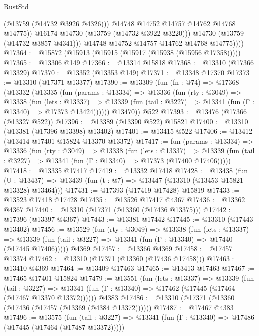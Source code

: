 \begin{lexlean}{RustStd}
\begin{coremodule}
                      (@13759 (@14732 @3926 @4326)))
                    @14748
                    @14752
                    @14757
                    @14762
                    @14768
                    @14775))
                @16174
                @14730
                (@13759 (@14732 @3922 @3220)))
              @14730
              (@13759 (@14732 @3857 @4341)))
            @14748
            @14752
            @14757
            @14762
            @14768
            @14775))))
@17364 := @15872 (@15913 (@15915 (@15917 (@15938 (@15956 @17358)))))
@17365 := @13306 @149
@17366 := @13314 @15818
@17368 := @13310 (@17366 @13329)
@17370 := @13352 (@13353 @149)
@17371 := @13348 @17370
@17373 := @13310 (@17371 @13377)
@17390 := @13309
    (fun (fn : @74) =>
    @17368
      (@13332
        (@13335
          (fun (params : @13334) =>
          @13336
            (fun (rty : @3049) =>
            @13338
              (fun (lets : @13337) =>
              @13339 (fun (tail : @3227) => @13341 (fun (Γ : @13340) => @17373 @13424))))))
        @13470))
    @522
@17393 := @13476 (@17366 (@13327 @522))
@17396 := @13389 (@13390 @522) @15821
@17400 := @13310 (@13381 (@17396 @13398) @13402)
@17401 := @13415 @522
@17406 := @13412 (@13414 @17401 @15824 @13370 @13372)
@17417 := fun (params : @13334) =>
  @13336
    (fun (rty : @3049) =>
    @13338
      (fun (lets : @13337) =>
      @13339 (fun (tail : @3227) => @13341 (fun (Γ : @13340) => @17373 (@17400 @17406)))))
@17418 := @13335 @17417
@17419 := @13332 @17418
@17428 := @13438
    (fun (U : @13437) => @13439 (fun (t : @7) => @13447 (@13310 (@13453 @15821 @13328) @13464)))
@17431 := @17393 (@17419 @17428) @15819
@17433 := @13523 @17418 @17428
@17435 := @13526 @17417 @4367
@17436 := @13362 @4367
@17440 := @13310 (@17371 (@13360 (@17436 @13375)))
@17442 := @17396 (@13397 @4367)
@17443 := @13381 @17442
@17445 := @13310 (@17443 @13402)
@17456 := @13529
    (fun (rty : @3049) =>
    @13338
      (fun (lets : @13337) =>
      @13339 (fun (tail : @3227) => @13341 (fun (Γ : @13340) => @17440 (@17445 @17406)))))
    @4369
@17457 := @13366 @4369
@17458 := @17457 @13374
@17462 := @13310 (@17371 (@13360 (@17436 @17458)))
@17463 := @13410 @4369
@17464 := @13409 @17463
@17465 := @13413 @17463
@17467 := @17465 @17401 @15824
@17479 := @13551
    (fun (lets : @13337) =>
    @13339
      (fun (tail : @3227) =>
      @13341 (fun (Γ : @13340) => @17462 (@17445 (@17464 (@17467 @13370 @13372))))))
    @4383
@17486 := @13310 (@17371 (@13360 (@17436 (@17457 (@13369 (@4384 @13372))))))
@17487 := @17467 @4383
@17496 := @13575
    (fun (tail : @3227) => @13341 (fun (Γ : @13340) => @17486 (@17445 (@17464 (@17487 @13372)))))

\end{coremodule}
\end{lexlean}
